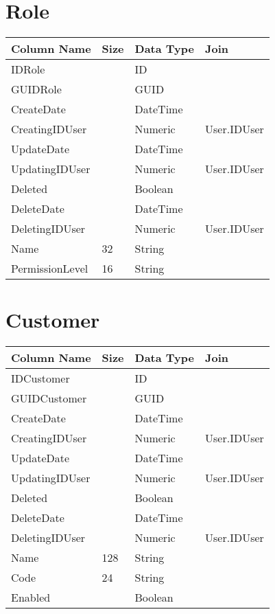 \section{Role}
\begin{small}
\begin{tabular}{ p{5cm} p{1cm} p{3cm}  p{3.75cm} }
\textbf{Column Name} & \textbf{Size} & \textbf{Data Type} & \textbf{Join} \\ \hline 
IDRole &  & ID &  \\ 
GUIDRole &  & GUID &  \\ 
CreateDate &  & DateTime &  \\ 
CreatingIDUser &  & Numeric & User.IDUser \\ 
UpdateDate &  & DateTime &  \\ 
UpdatingIDUser &  & Numeric & User.IDUser \\ 
Deleted &  & Boolean &  \\ 
DeleteDate &  & DateTime &  \\ 
DeletingIDUser &  & Numeric & User.IDUser \\ 
Name & 32 & String &  \\ 
PermissionLevel & 16 & String &  \\ 
\end{tabular}
\end{small}

\section{Customer}
\begin{small}
\begin{tabular}{ p{5cm} p{1cm} p{3cm}  p{3.75cm} }
\textbf{Column Name} & \textbf{Size} & \textbf{Data Type} & \textbf{Join} \\ \hline 
IDCustomer &  & ID &  \\ 
GUIDCustomer &  & GUID &  \\ 
CreateDate &  & DateTime &  \\ 
CreatingIDUser &  & Numeric & User.IDUser \\ 
UpdateDate &  & DateTime &  \\ 
UpdatingIDUser &  & Numeric & User.IDUser \\ 
Deleted &  & Boolean &  \\ 
DeleteDate &  & DateTime &  \\ 
DeletingIDUser &  & Numeric & User.IDUser \\ 
Name & 128 & String &  \\ 
Code & 24 & String &  \\ 
Enabled &  & Boolean &  \\ 
\end{tabular}
\end{small}
